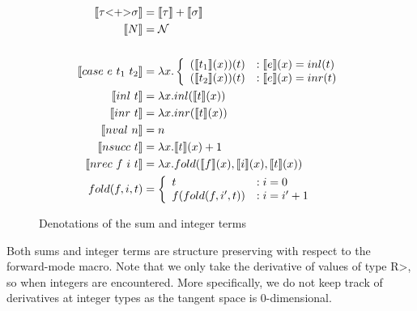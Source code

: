   \begin{figure}
    \centering
    \begin{equation*}
      \begin{split}
        \llbracket \tau \text{<+>} \sigma \rrbracket &= \llbracket \tau \rrbracket + \llbracket \sigma \rrbracket \\
        \llbracket N \rrbracket &= \mathcal{N} \\
        \\
        \llbracket case\ e\ t_1\ t_2 \rrbracket &= \lambda x.
          \left\{
            \begin{array}{ll}
              (\llbracket t_1 \rrbracket(x))(t)
                & : \llbracket e \rrbracket(x) = inl(t) \\
              (\llbracket t_2 \rrbracket(x))(t)
                & : \llbracket e \rrbracket(x) = inr(t) \\
            \end{array}
          \right. \\
        \llbracket inl\ t \rrbracket &= \lambda x. inl(\llbracket t \rrbracket(x)) \\
        \llbracket inr\ t \rrbracket &= \lambda x. inr(\llbracket t \rrbracket(x)) \\
        \llbracket nval\ n \rrbracket &= n \\
        \llbracket nsucc\ t \rrbracket &= \lambda x. \llbracket t \rrbracket(x) + 1 \\
        \llbracket nrec\ f\ i\ t \rrbracket &= \lambda x. fold(\llbracket f \rrbracket(x), \llbracket i \rrbracket(x), \llbracket t \rrbracket(x)) \\
        fold(f, i, t) &=
          \left\{
            \begin{array}{ll}
              t &: i = 0 \\
              f(fold(f, i', t))
                &: i = i' + 1 \\
            \end{array}
          \right. \\
      \end{split}
    \end{equation*}
    \caption{Denotations of the sum and integer terms}
    \label{eqn:denotation_sums_prim}
  \end{figure}

  Both sums and integer terms are structure preserving with respect to the forward-mode macro.
  Note that we only take the derivative of values of type \<R>, so when integers are encountered.
  More specifically, we do not keep track of derivatives at integer types as the tangent space is $0$-dimensional.

